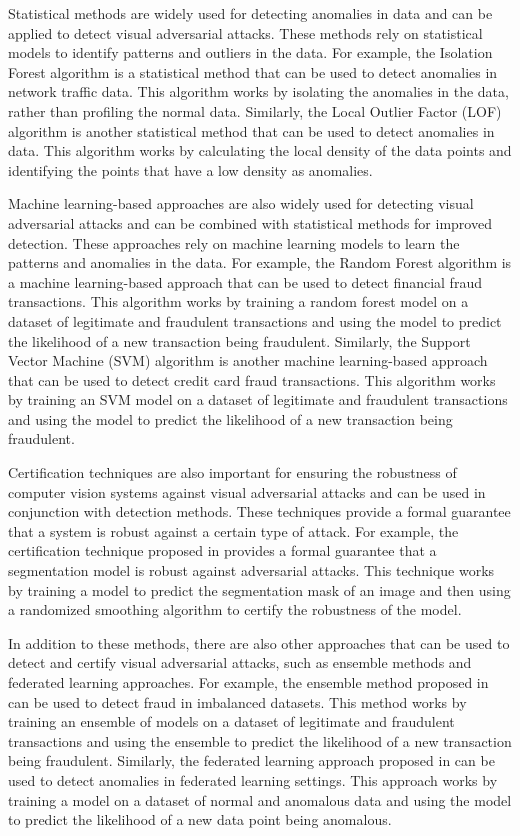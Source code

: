 \documentclass[11pt]{article}
\begin{document}
Statistical methods are widely used for detecting anomalies in data and can be applied to detect visual adversarial attacks. These methods rely on statistical models to identify patterns and outliers in the data. For example, the Isolation Forest algorithm \cite{ref115} is a statistical method that can be used to detect anomalies in network traffic data. This algorithm works by isolating the anomalies in the data, rather than profiling the normal data. Similarly, the Local Outlier Factor (LOF) algorithm \cite{ref116} is another statistical method that can be used to detect anomalies in data. This algorithm works by calculating the local density of the data points and identifying the points that have a low density as anomalies.

Machine learning-based approaches are also widely used for detecting visual adversarial attacks and can be combined with statistical methods for improved detection. These approaches rely on machine learning models to learn the patterns and anomalies in the data. For example, the Random Forest algorithm \cite{ref117} is a machine learning-based approach that can be used to detect financial fraud transactions. This algorithm works by training a random forest model on a dataset of legitimate and fraudulent transactions and using the model to predict the likelihood of a new transaction being fraudulent. Similarly, the Support Vector Machine (SVM) algorithm \cite{ref118} is another machine learning-based approach that can be used to detect credit card fraud transactions. This algorithm works by training an SVM model on a dataset of legitimate and fraudulent transactions and using the model to predict the likelihood of a new transaction being fraudulent.

Certification techniques are also important for ensuring the robustness of computer vision systems against visual adversarial attacks and can be used in conjunction with detection methods. These techniques provide a formal guarantee that a system is robust against a certain type of attack. For example, the certification technique proposed in \cite{ref119} provides a formal guarantee that a segmentation model is robust against adversarial attacks. This technique works by training a model to predict the segmentation mask of an image and then using a randomized smoothing algorithm to certify the robustness of the model.

In addition to these methods, there are also other approaches that can be used to detect and certify visual adversarial attacks, such as ensemble methods and federated learning approaches. For example, the ensemble method proposed in \cite{ref120} can be used to detect fraud in imbalanced datasets. This method works by training an ensemble of models on a dataset of legitimate and fraudulent transactions and using the ensemble to predict the likelihood of a new transaction being fraudulent. Similarly, the federated learning approach proposed in \cite{ref121} can be used to detect anomalies in federated learning settings. This approach works by training a model on a dataset of normal and anomalous data and using the model to predict the likelihood of a new data point being anomalous.
\end{document}

